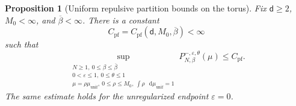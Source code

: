 \documentclass[11pt,reqno]{amsart}
\numberwithin{equation}{section}
\theoremstyle{plain}
\newtheorem{prop}[prop]{Proposition}
\theoremstyle{definition}
\renewcommand{\d}{\mathsf d}
\newcommand{\dd}{\mathop{}\!\mathrm d}
\newcommand{\be}{\beta}
\newcommand{\vep}{\varepsilon}
\newcommand{\muunif}{\mu_{\mathrm{unif}}}
\begin{document}
\begin{prop}[Uniform repulsive partition bounds on the torus]\label{rep:prop:DGR-class-uniform}
Fix $\d\ge2$, $M_0<\infty$, and $\overline\be<\infty$.  There is a constant
\begin{equation}\label{rep:eq:DGR-uniform-constant}
 C_{\mathrm{pf}}=C_{\mathrm{pf}}(\d,M_0,\overline\be)<\infty
\end{equation}
such that
\begin{equation}\label{rep:eq:DGR-class-uniform}
 \sup_{\substack{N\ge1,\ 0\le\be\le\overline\be\\
 0<\vep\le1,\ 0\le\theta\le1\\
 \mu=\rho\muunif,\ 0\le\rho\le M_0,\ \int\rho\,\dd\muunif=1}}
 P^{-,\vep,\theta}_{N,\be}(\mu)
 \le C_{\mathrm{pf}}.
\end{equation}
The same estimate holds for the unregularized endpoint $\vep=0$.
\end{prop}
\end{document}
